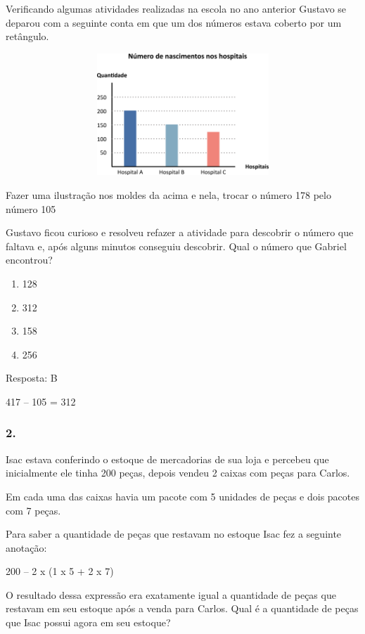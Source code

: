 Verificando algumas atividades realizadas na escola no ano anterior
Gustavo se deparou com a seguinte conta em que um dos números estava
coberto por um retângulo.

\includegraphics[width=5.39213in,height=1.80849in]{media/image38.png}

Fazer uma ilustração nos moldes da acima e nela, trocar o número 178
pelo número 105

Gustavo ficou curioso e resolveu refazer a atividade para descobrir o
número que faltava e, após alguns minutos conseguiu descobrir. Qual o
número que Gabriel encontrou?

\begin{enumerate}
\def\labelenumi{\alph{enumi})}
\item
  128
\item
  312
\item
  158
\item
  256
\end{enumerate}

Resposta: B

417 -- 105 = 312

\subsubsection{2.}\label{section-24}

Isac estava conferindo o estoque de mercadorias de sua loja e percebeu
que inicialmente ele tinha 200 peças, depois vendeu 2 caixas com peças
para Carlos.

Em cada uma das caixas havia um pacote com 5 unidades de peças e dois
pacotes com 7 peças.

Para saber a quantidade de peças que restavam no estoque Isac fez a
seguinte anotação:

200 -- 2 x (1 x 5 + 2 x 7)

O resultado dessa expressão era exatamente igual a quantidade de peças
que restavam em seu estoque após a venda para Carlos. Qual é a
quantidade de peças que Isac possui agora em seu estoque?

